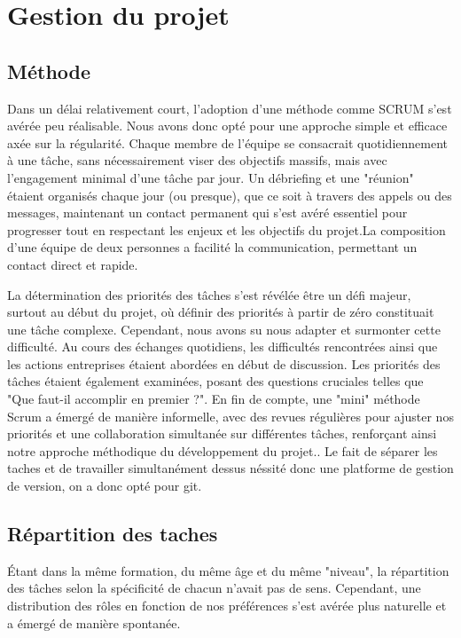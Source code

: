 \documentclass{article}
\begin{document}
\section{Gestion du projet}

\subsection{Méthode}

Dans un délai relativement court, l'adoption d'une méthode comme SCRUM s'est avérée peu réalisable. Nous avons donc opté pour une approche simple et efficace axée sur la régularité. Chaque membre de l'équipe se consacrait quotidiennement à une tâche, sans nécessairement viser des objectifs massifs, mais avec l'engagement minimal d'une tâche par jour. Un débriefing et une "réunion" étaient organisés chaque jour (ou presque), que ce soit à travers des appels ou des messages, maintenant un contact permanent qui s'est avéré essentiel pour progresser tout en respectant les enjeux et les objectifs du projet.La composition d'une équipe de deux personnes a facilité la communication, permettant un contact direct et rapide. 

La détermination des priorités des tâches s'est révélée être un défi majeur, surtout au début du projet, où définir des priorités à partir de zéro constituait une tâche complexe. Cependant, nous avons su nous adapter et surmonter cette difficulté. Au cours des échanges quotidiens, les difficultés rencontrées ainsi que les actions entreprises étaient abordées en début de discussion. Les priorités des tâches étaient également examinées, posant des questions cruciales telles que "Que faut-il accomplir en premier ?". En fin de compte, une "mini" méthode Scrum a émergé de manière informelle, avec des revues régulières pour ajuster nos priorités et une collaboration simultanée sur différentes tâches, renforçant ainsi notre approche méthodique du développement du projet.. Le fait de séparer les taches et de travailler simultanément dessus néssité donc une platforme de gestion de version, on a donc opté pour git.


\subsection{Répartition des taches}

Étant dans la même formation, du même âge et du même "niveau", la répartition des tâches selon la spécificité de chacun n'avait pas de sens. Cependant, une distribution des rôles en fonction de nos préférences s'est avérée plus naturelle et a émergé de manière spontanée.
\end{document}
